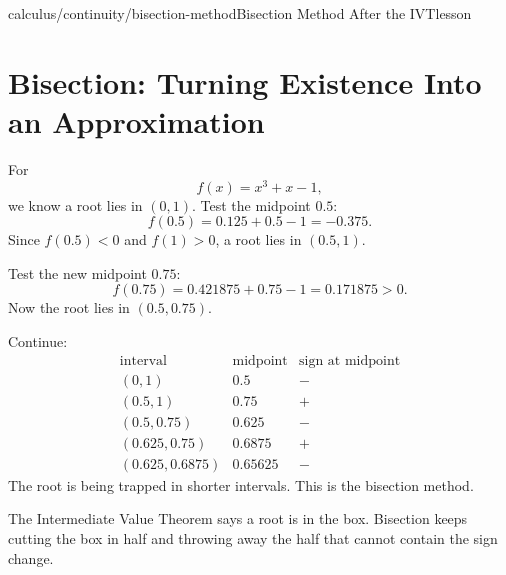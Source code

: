 \begin{webpage}{calculus/continuity/bisection-method}{Bisection Method After the IVT}{lesson}
\section{Bisection: Turning Existence Into an Approximation}


For
\[
  f(x)=x^3+x-1,
\]
we know a root lies in \((0,1)\). Test the midpoint \(0.5\):
\[
  f(0.5)=0.125+0.5-1=-0.375.
\]
Since \(f(0.5)<0\) and \(f(1)>0\), a root lies in \((0.5,1)\).

Test the new midpoint \(0.75\):
\[
  f(0.75)=0.421875+0.75-1=0.171875>0.
\]
Now the root lies in \((0.5,0.75)\).

Continue:
\[
\begin{array}{c|c|c}
\text{interval}&\text{midpoint}&\text{sign at midpoint}\\
\hline
(0,1)&0.5&-\\
(0.5,1)&0.75&+\\
(0.5,0.75)&0.625&-\\
(0.625,0.75)&0.6875&+\\
(0.625,0.6875)&0.65625&-
\end{array}
\]
The root is being trapped in shorter intervals. This is the bisection method.

\begin{bgconcept}
The Intermediate Value Theorem says a root is in the box. Bisection keeps cutting the box in half and throwing away the half that cannot contain the sign change.
\end{bgconcept}
\end{webpage}

